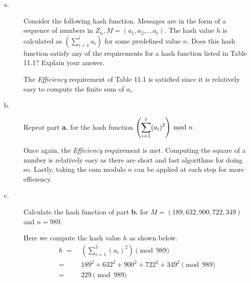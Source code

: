 \documentclass[../hw_sols.tex]{subfiles}
\begin{document}
\begin{description}

\item[a.] Consider the following hash function. Messages are in the form of a 
sequence of numbers in $Z_n, M = (a_1, a_2, \dots a_t)$. The hash value $h$ 
is calculated as $\displaystyle \left( \sum_{i=1}^t a_i \right)$ for some 
predefined value $n$. Does this hash function satisfy any of the requirements 
for a hash function listed in Table 11.1? Explain your answer.

\begin{solution}
The \textit{Efficiency} requirement of Table 11.1 is satisfied since it is 
relatively easy to compute the finite sum of $a_i$.
\end{solution}

\item[b.] Repeat part \textbf{a.} for the hash function 
$\displaystyle \left( \sum_{i=1}^t (a_i)^2 \right) \tmod{n}$.

\begin{solution}
Once again, the \textit{Efficiency} requirement is met. Computing the square 
of a number is relatively easy as there are short and fast algorithms for 
doing so. Lastly, taking the sum modulo $n$ can be applied at each step 
for more efficiency.
\end{solution}

\item[c.] Calculate the hash function of part \textbf{b.} for 
$M = (189, 632, 900, 722, 349)$ and $n = 989$.

\begin{solution}
Here we compute the hash value $h$ as shown below.
\begin{align*}
	h \; 
	=& \; \left(\sum_{i=1}^{5} (a_i)^2 \right) \pmod{989} \\
	=& \; 189^2 + 632^2 + 900^2 + 722^2 + 349^2 \pmod{989} \\
	=& \; 229 \pmod{989}
\end{align*}
\end{solution}

\end{description}


\newpage


\end{document}
